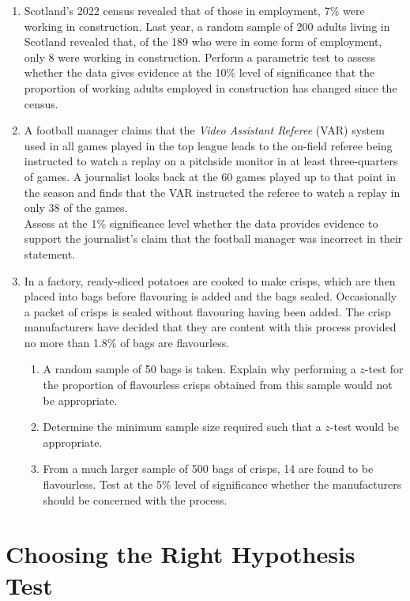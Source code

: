 \documentclass[
  11pt,
]{book}
\begin{document}
\begin{enumerate}
    \item Scotland's 2022 census revealed that of those in employment, 7\% were working in construction. Last year, a random sample of 200 adults living in Scotland revealed that, of the 189 who were in some form of employment, only 8 were working in construction. Perform a parametric test to assess whether the data gives evidence at the 10\% level of significance that the proportion of working adults employed in construction has changed since the census.
    \item A football manager claims that the \textit{Video Assistant Referee} (VAR) system used in all games played in the top league leads to the on-field referee being instructed to watch a replay on a pitchside monitor in at least three-quarters of games. A journalist looks back at the 60 games played up to that point in the season and finds that the VAR instructed the referee to watch a replay in only 38 of the games.\\[0.5em] Assess at the 1\% significance level whether the data provides evidence to support the journalist's claim that the football manager was incorrect in their statement.
    \item In a factory, ready-sliced potatoes are cooked to make crisps, which are then placed into bags before flavouring is added and the bags sealed. Occasionally a packet of crisps is sealed without flavouring having been added. The crisp manufacturers have decided that they are content with this process provided no more than 1.8\% of bags are flavourless.
    \begin{enumerate}
        \item A random sample of 50 bags is taken. Explain why performing a $z$-test for the proportion of flavourless crisps obtained from this sample would not be appropriate.
        \item Determine the minimum sample size required such that a $z$-test would be appropriate.
        \item From a much larger sample of 500 bags of crisps, 14 are found to be flavourless. Test at the 5\% level of significance whether the manufacturers should be concerned with the process.
    \end{enumerate}
\end{enumerate}

\pagebreak

\section{Choosing the Right Hypothesis Test}\label{choosing-the-right-hypothesis-test}
\end{document}
